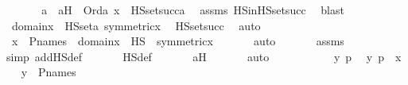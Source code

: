 \begin{isabellebody}
\ \ \isanewline
\ \ \isamarkupfalse%
\ a\ \ aH\ {\isacharcolon}{\kern0pt}\ {\isachardoublequoteopen}Ord{\isacharparenleft}{\kern0pt}a{\isacharparenright}{\kern0pt}{\isachardoublequoteclose}\ {\isachardoublequoteopen}x\ {\isasymin}\ HS{\isacharunderscore}{\kern0pt}set{\isacharparenleft}{\kern0pt}succ{\isacharparenleft}{\kern0pt}a{\isacharparenright}{\kern0pt}{\isacharparenright}{\kern0pt}{\isachardoublequoteclose}\ \isamarkupfalse%
\ assms\ HS{\isacharunderscore}{\kern0pt}in{\isacharunderscore}{\kern0pt}HS{\isacharunderscore}{\kern0pt}set{\isacharunderscore}{\kern0pt}succ\ \isamarkupfalse%
\ blast\isanewline
\ \ \isamarkupfalse%
\ \isamarkupfalse%
\ {\isachardoublequoteopen}domain{\isacharparenleft}{\kern0pt}x{\isacharparenright}{\kern0pt}\ {\isasymsubseteq}\ HS{\isacharunderscore}{\kern0pt}set{\isacharparenleft}{\kern0pt}a{\isacharparenright}{\kern0pt}{\isachardoublequoteclose}\ {\isachardoublequoteopen}symmetric{\isacharparenleft}{\kern0pt}x{\isacharparenright}{\kern0pt}{\isachardoublequoteclose}\ \isamarkupfalse%
\ HS{\isacharunderscore}{\kern0pt}set{\isacharunderscore}{\kern0pt}succ\ \isamarkupfalse%
\ auto\ \isanewline
\ \ \isamarkupfalse%
\ \isamarkupfalse%
\ {\isachardoublequoteopen}x\ {\isasymin}\ P{\isacharunderscore}{\kern0pt}names\ {\isasymand}\ domain{\isacharparenleft}{\kern0pt}x{\isacharparenright}{\kern0pt}\ {\isasymsubseteq}\ HS\ {\isasymand}\ symmetric{\isacharparenleft}{\kern0pt}x{\isacharparenright}{\kern0pt}{\isachardoublequoteclose}\ \isanewline
\ \ \ \ \isamarkupfalse%
\ auto\ \isanewline
\ \ \ \ \isamarkupfalse%
\ assms\ \isanewline
\ \ \ \ \ \isamarkupfalse%
{\isacharparenleft}{\kern0pt}simp\ add{\isacharcolon}{\kern0pt}HS{\isacharunderscore}{\kern0pt}def{\isacharparenright}{\kern0pt}\ \isanewline
\ \ \ \ \isamarkupfalse%
\ HS{\isacharunderscore}{\kern0pt}def\ \isanewline
\ \ \ \ \isamarkupfalse%
\ aH\ \isanewline
\ \ \ \ \isamarkupfalse%
\ auto\isanewline
\ \ \isamarkupfalse%
\ {\isacharminus}{\kern0pt}\ \isanewline
\ \ \ \ \isamarkupfalse%
\ y\ p\ \isamarkupfalse%
\ {\isachardoublequoteopen}{\isacharless}{\kern0pt}y{\isacharcomma}{\kern0pt}\ p{\isachargreater}{\kern0pt}\ {\isasymin}\ x{\isachardoublequoteclose}\ \isamarkupfalse%
\ \isamarkupfalse%
\ {\isachardoublequoteopen}y\ {\isasymin}\ P{\isacharunderscore}{\kern0pt}names{\isachardoublequoteclose}\ \isamarkupfalse%

\end{isabellebody}
